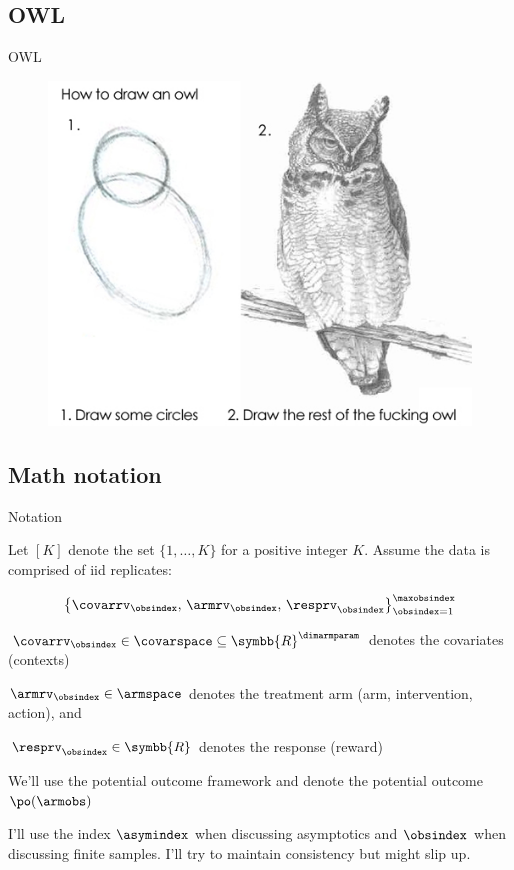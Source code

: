 \documentclass[aspectratio=169, professionalfonts]{beamer}
\begin{document}
\subsection{OWL}
\begin{frame}{OWL}
	\begin{figure}
		\includegraphics[width=.6\textwidth]{figures/how-to-draw-an-owl}
	\end{figure}
\end{frame}
\subsection{Math notation}
\begin{frame}[label={sec:org00d2d44}]{Notation}

	Let $[K]$ denote the set $\{1, \ldots, K \}$ for a positive integer $K$. Assume
	the data is comprised of iid replicates:

	\begin{equation*}
		\left\{{\covarrv}_{\obsindex},\, {\armrv}_{\obsindex},\,
		{\resprv}_{\obsindex} \right\}_{\obsindex = 1}^{\maxobsindex}
	\end{equation*}


	$\covarrv_{\obsindex} \in \covarspace \subseteq
		\symbb{R}^{\dimarmparam}$ denotes the covariates (contexts)

	$\armrv_{ \obsindex} \in \armspace$ denotes the treatment arm (arm,
	intervention, action), and

	$\resprv_{ \obsindex} \in \symbb{R}$ denotes the response (reward)

	\vfill \pause

	We'll use the potential outcome framework and denote the potential outcome 	$\po(\armobs)$

	\vfill \pause
	I'll use the index $\asymindex$ when discussing asymptotics and $\obsindex$ when discussing finite samples.	I'll try to maintain consistency but might slip up.
\end{frame}
\end{document}

